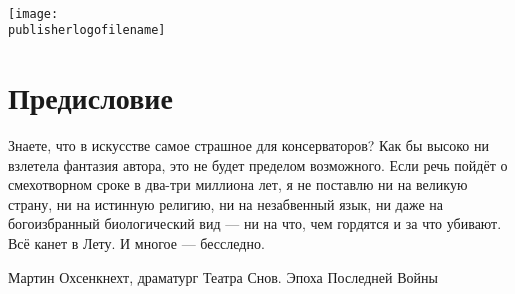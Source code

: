 % 


\begin{titlepage}
{
\centering
{~\par}
\vspace{0.25\textheight}
{\LARGE\bookauthor\par}
\vspace{1.3cm}
{\Huge\textbf{\booktitle}\par}
\vfill
{\texttt{[image: \\publisherlogofilename]}\par}
}
\end{titlepage}


\tableofcontents

\pagestyle{fancy}

\chapter*{Предисловие}

\epigraph
{Знаете, что в искусстве самое страшное для консерваторов?
Как бы высоко ни взлетела фантазия автора, это не будет пределом возможного.
Если речь пойдёт о смехотворном сроке в два-три миллиона лет, я не поставлю ни на великую страну, ни на истинную религию, ни на незабвенный язык, ни даже на богоизбранный биологический вид --- ни на что, чем гордятся и за что убивают.
Всё канет в Лету\FM.
И многое --- бесследно.}
{Мартин Охсенкнехт, драматург Театра Снов.
Эпоха Последней Войны}


